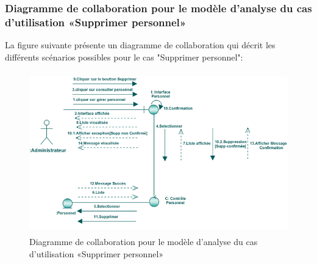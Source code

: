 \documentclass[12 pt]{report}
\begin{document}
\subsubsection{Diagramme de collaboration pour le modèle d’analyse du cas d'utilisation                                       «Supprimer personnel»}
La figure suivante présente un diagramme de collaboration qui décrit les différents
scénarios possibles pour le cas "Supprimer personnel":
\begin{figure}[h]
 \begin{center}
\includegraphics[width= 12 cm ,height=  7cm]{colla_adm_supprimerpersonnel.PNG}
\caption{Diagramme de collaboration pour le modèle d’analyse du cas d'utilisation                                       «Supprimer personnel»}

\end{center}
\end{figure}
\end{document}
